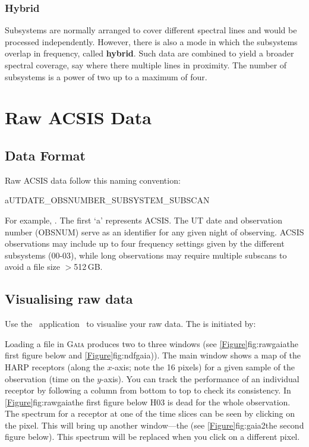 \documentclass[11pt,oneside,chapters]{starlink}
\begin{document}
\subsection{Hybrid}
\label{sec:hybrid}

Subsystems are normally arranged to cover different spectral lines and
would be processed independently.  However, there is also a mode in
which the subsystems overlap in frequency, called \textbf{hybrid}.
Such data are combined to yield a broader spectral coverage, say where
there multiple lines in proximity.  The number of subsystems is a
power of two up to a maximum of four.

\clearpage
\chapter{Raw ACSIS Data}
\label{sec:raw}

\section{Data Format}
Raw ACSIS data follow this naming convention:

aUTDATE\_OBSNUMBER\_SUBSYSTEM\_SUBSCAN

For example, . The first `a' represents
ACSIS. The UT date and observation number (OBSNUM) serve as an
identifier for any given night of observing. ACSIS observations may
include up to four frequency settings given by the different
subsystems (00-03), while long observations may require multiple
subscans to avoid a file size $>$512\,GB.



\section{Visualising raw data}
\label{sec:exam}

Use the \starlink\ application \gaia\ to visualise your raw data. The
is initiated by:

\begin{terminalv}
\end{terminalv}

Loading a file in \textsc{Gaia} produces two to three windows (see
\cref{Figure}{fig:rawgaia}{the first figure below} and 
\cref{Figure}{fig:ndfgaia})). The main window
shows a map of the HARP receptors (along the $x$-axis; note the 16
pixels) for a given sample of the observation (time on the $y$-axis).
You can track the performance of an individual receptor by following a
column from bottom to top to check its consistency. In
\cref{Figure}{fig:rawgaia}{the first figure below} H03 is dead for the
whole observation. The spectrum for a receptor at one of the time
slices can be seen by clicking on the pixel. This will bring up 
another window---the  (see
\cref{Figure}{fig:gaia2}{the second figure below}). This spectrum will
be replaced when you click on a different pixel.
\end{document}
